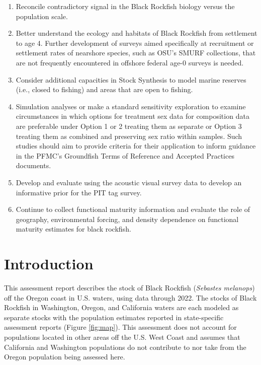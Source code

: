 \documentclass[11pt,
  english,
  letterpaper,
]{article}
\begin{document}
\begin{enumerate}
\item
  Reconcile contradictory signal in the Black Rockfish biology versus the population scale.
\item
  Better understand the ecology and habitats of Black Rockfish from settlement to age 4. Further development of surveys aimed specifically at recruitment or settlement rates of nearshore species, such as OSU's SMURF collections, that are not frequently encountered in offshore federal age-0 surveys is needed.
\item
  Consider additional capacities in Stock Synthesis to model marine reserves (i.e., closed to fishing) and areas that are open to fishing.
\item
  Simulation analyses or make a standard sensitivity exploration to examine circumstances in which options for treatment sex data for composition data are preferable under Option 1 or 2 treating them as separate or Option 3 treating them as combined and preserving sex ratio within samples. Such studies should aim to provide criteria for their application to inform guidance in the PFMC's Groundfish Terms of Reference and Accepted Practices documents.
\item
  Develop and evaluate using the acoustic visual survey data to develop an informative prior for the PIT tag survey.
\item
  Continue to collect functional maturity information and evaluate the role of geography, environmental forcing, and density dependence on functional maturity estimates for black rockfish.
\end{enumerate}

\vspace{500cm}

\pagebreak
\setlength{\parskip}{5mm plus1mm minus1mm}
\setcounter{page}{1}
\renewcommand{\thefigure}{\arabic{figure}}
\renewcommand{\thetable}{\arabic{table}}
\setcounter{table}{0}
\setcounter{figure}{0}

\hypertarget{introduction}{%
\section{Introduction}\label{introduction}}

This assessment report describes the stock of Black Rockfish (\emph{Sebastes melanops}) off the Oregon coast in U.S. waters, using data through 2022. The stocks of Black Rockfish in Washington, Oregon, and California waters are each modeled as separate stocks with the population estimates reported in state-specific assessment reports (Figure \ref{fig:map}). This assessment does not account for populations located in other areas off the U.S. West Coast and assumes that California and Washington populations do not contribute to nor take from the Oregon population being assessed here.
\end{document}
